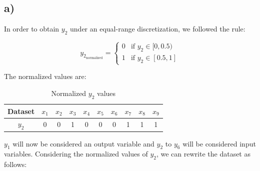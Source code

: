 \documentclass{article}
\begin{document}
\subsection*{a)}

In order to obtain $y_2$ under an equal-range discretization, we followed the rule:

\[ y_{2_{\text{normalized}}} = \begin{cases}
  0 & \text{if } y_2 \in [0, 0.5) \\
  1 & \text{if } y_2 \in [0.5, 1]
\end{cases} \]

The normalized values are:

\begin{table}[H]
\centering
\begin{tabular}{|c|c|c|c|c|c|c|c|c|c|}
  \hline
  Dataset & $x_1$ & $x_2$ & $x_3$ & $x_4$ & $x_5$ & $x_6$ & $x_7$ & $x_8$ & $x_9$ \\ \hline
  $y_2$ & 0 & 0 & 1 & 0 & 0 & 0 & 1 & 1 & 1 \\ \hline
\end{tabular}
\label{tab:dataset2}
\caption{Normalized $y_2$ values}
\end{table}

$y_1$ will now be considered an output variable and $y_2$ to $y_6$ will be considered input variables.
Considering the normalized values of $y_2$, we can rewrite the dataset as follows:
\end{document}
